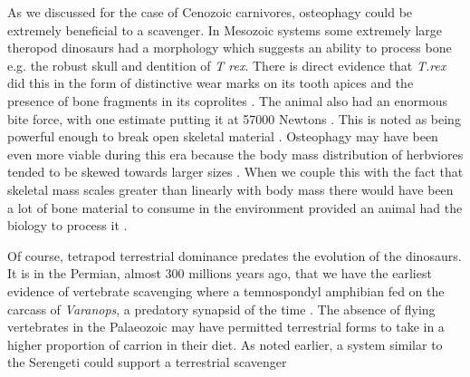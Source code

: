 \documentclass[a4paper,12pt]{article}
\begin{document}
As we discussed for the case of Cenozoic carnivores, osteophagy could be extremely beneficial to a scavenger. 
In Mesozoic systems some extremely large theropod dinosaurs had a morphology which suggests an ability to process bone e.g. the robust skull and dentition of \textit{T rex}. There is direct evidence that \textit{T.rex} did this in the form of distinctive wear marks on its tooth apices \citep{farlow1994wear,schubert2005wear} and the presence of bone fragments in its coprolites \citep{chin1998king}. The animal also had an enormous bite force, with one estimate putting it at 57000 Newtons \citep{bates2012estimating}. This is noted as being powerful enough to break open skeletal material \citep{rayfield2001cranial}. Osteophagy may have been even more viable during this era because the body mass distribution of herbviores tended to be skewed towards larger sizes \citep{10.1371/journal.pone.0051925}. When we couple this with the fact that skeletal mass scales greater than linearly with body mass \citep{prange1979scaling} there would have been a lot of bone material to consume in the environment provided an animal had the biology to process it  \citep{chure1997one}. 

Of course, tetrapod terrestrial dominance predates the evolution of the dinosaurs. It is in the Permian, almost 300 millions years ago, that we have the earliest evidence of vertebrate scavenging where a temnospondyl amphibian fed on the carcass of \textit{Varanops}, a predatory synapsid of the time \citep{reisz2006articulated}. The absence of flying vertebrates in the Palaeozoic may have permitted terrestrial forms to take in a higher proportion of carrion in their diet. As noted earlier, a system similar to the Serengeti could support a terrestrial scavenger \citep{ruxton2004obligate} 
\end{document}
